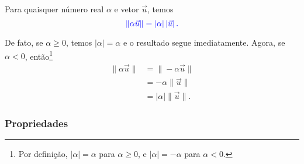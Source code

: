 \begin{proposicao}
  Para quaisquer número real $\alpha$ e vetor $\vec{u}$, temos
  \begin{equation}\color{blue}\|\alpha\vec{u}\| = |\alpha|\left|\vec{u}\right|.
  \end{equation}
\end{proposicao}
\begin{demonstracao}
  De fato, se $\alpha \geq 0$, temos $|\alpha| = \alpha$ e o resultado segue imediatamente. Agora, se $\alpha < 0$, então\footnote{Por definição, $|\alpha| = \alpha$ para $\alpha\geq 0$, e $|\alpha| = -\alpha$ para $\alpha<0$.}
  \begin{align}
    \|\alpha\vec{u}\| &= \|-\alpha\vec{u}\|\\
    &= -\alpha\|\vec{u}\|\\
    &= |\alpha|\|\vec{u}\|.
  \end{align}  
\end{demonstracao}

\subsubsection{Propriedades}

